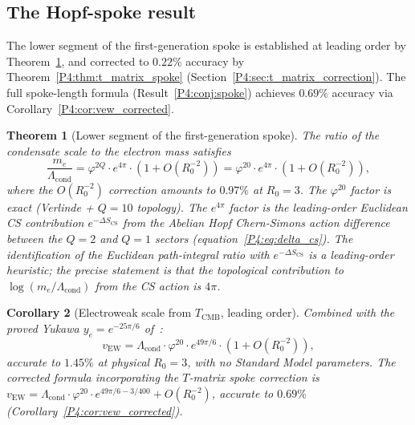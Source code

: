 \documentclass[11pt,a4paper]{article}
\newtheorem{theorem}{Theorem}[section]
\newtheorem{corollary}[theorem]{Corollary}
\theoremstyle{definition}
\theoremstyle{remark}
\newcommand{\vp}{\varphi}
\newcommand{\TCMB}{T_{\mathrm{CMB}}}
\newcommand{\vEW}{v_{\mathrm{EW}}}
\newcommand{\Lcond}{\Lambda_{\mathrm{cond}}}
\begin{document}
\subsection{The Hopf-spoke result}

The lower segment of the first-generation spoke is established at leading
order by Theorem~\ref{P4:thm:second_spoke}, and corrected to $0.22\%$ accuracy
by Theorem~\ref{P4:thm:t_matrix_spoke} (Section~\ref{P4:sec:t_matrix_correction}).
The full spoke-length formula (Result~\ref{P4:conj:spoke}) achieves $0.69\%$
accuracy via Corollary~\ref{P4:cor:vew_corrected}.

\begin{theorem}[Lower segment of the first-generation spoke]
\label{P4:thm:second_spoke}
The ratio of the condensate scale to the electron mass satisfies
\begin{equation}
  \frac{m_e}{\Lcond} = \vp^{2Q}\cdot e^{4\pi}\cdot(1 + O(R_0^{-2}))
  = \vp^{20}\cdot e^{4\pi}\cdot(1 + O(R_0^{-2})),
  \label{P4:eq:spoke_leading}
\end{equation}
where the $O(R_0^{-2})$ correction amounts to $0.97\%$ at $R_0=3$.
The $\vp^{20}$ factor is exact (Verlinde + $Q=10$ topology).
The $e^{4\pi}$ factor is the leading-order Euclidean CS contribution
$e^{-\Delta S_\mathrm{CS}}$ from the Abelian Hopf Chern-Simons action difference
between the $Q=2$ and $Q=1$ sectors (equation~\eqref{P4:eq:delta_cs}).
The identification of the Euclidean path-integral ratio with $e^{-\Delta S_\mathrm{CS}}$
is a leading-order heuristic; the precise statement is that the
topological contribution to $\log(m_e/\Lcond)$ from the CS action is $4\pi$.
\end{theorem}

\begin{corollary}[Electroweak scale from $\TCMB$, leading order]
\label{P4:cor:vew}
Combined with the proved Yukawa $y_e = e^{-25\pi/6}$ of~\cite{Paper1}:
\begin{equation}
  \vEW = \Lcond\cdot\vp^{20}\cdot e^{49\pi/6}\cdot(1+O(R_0^{-2})),
  \label{P4:eq:vew_leading}
\end{equation}
accurate to $1.45\%$ at physical $R_0=3$, with no Standard Model parameters.
The corrected formula incorporating the $T$-matrix spoke correction is
$\vEW = \Lcond\cdot\vp^{20}\cdot e^{49\pi/6-3/400}+O(R_0^{-2})$,
accurate to $0.69\%$ (Corollary~\ref{P4:cor:vew_corrected}).
\end{corollary}

\end{document}
